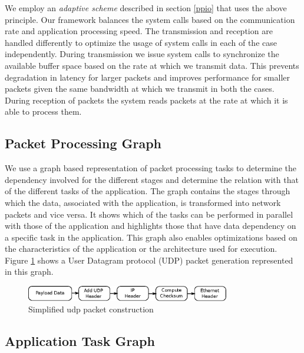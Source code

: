 \documentclass[conference]{IEEEtran}
\newcommand{\comment}[1]{}
\begin{document}
We employ an \textit{adaptive scheme} described in section \ref{ppio} that uses the above principle. Our framework balances the system calls based on the communication rate and application processing speed. The transmission and reception are handled differently to optimize the usage of system calls in each of the case independently. During transmission we issue system calls to synchronize the available buffer space based on the rate at which we transmit data. This prevents degradation in latency for larger packets and improves performance for smaller packets given the same bandwidth at which we transmit in both the cases. During reception of packets the system reads packets at the rate at which it is able to process them.

\subsection{Packet Processing Graph}

\comment{Understanding the set of packet processing tasks associated with the application is essential to performing them in parallel.} We use a graph based representation of packet processing tasks to determine the dependency involved for the different stages and determine the relation with that of the different tasks of the application. The graph contains the stages through which the data, associated with the application, is transformed into network packets and vice versa. It shows which of the tasks can be performed in parallel with those of the application and highlights those that have data dependency on a specific task in the application. This graph also enables optimizations based on the characteristics of the application or the architecture used for execution. Figure \ref{fig2} shows a User Datagram protocol (UDP) packet generation represented in this graph.\\

\begin{figure}[ht]
\centering
\includegraphics[width=3.5in]{pack-op}
\caption{Simplified udp packet construction}
\label{fig2}
\end{figure}

\subsection{Application Task Graph}
\end{document}
